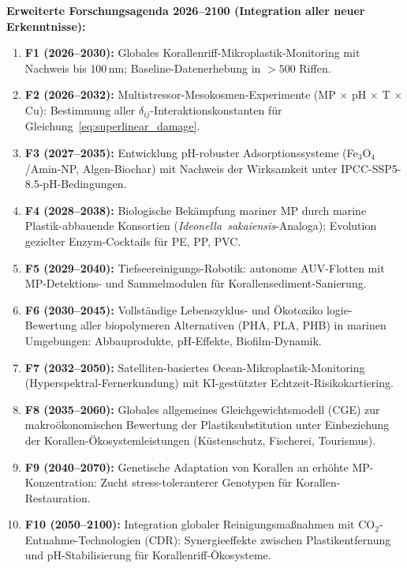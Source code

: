 ﻿\documentclass[12pt,a4paper]{article}
\theoremstyle{definition}
\theoremstyle{remark}
\newcommand{\MP}{Mikroplastik}
\begin{document}
\begin{mdframed}[backgroundcolor=boxblue, linecolor=deepblue, linewidth=1.5pt]
\textbf{Erweiterte Forschungsagenda 2026--2100 (Integration aller neuer Erkenntnisse):}
\begin{enumerate}[noitemsep, leftmargin=*, label=\textbf{F\arabic*.}]
  \item \textbf{F1 (2026--2030):} Globales Korallenriff-\MP{}-Monitoring
    mit Nachweis bis $100$\,nm; Baseline-Datenerhebung in $>500$ Riffen.
  \item \textbf{F2 (2026--2032):} Multistressor-Mesokosmen-Experimente
    (MP $\times$ pH $\times$ T $\times$ Cu): Bestimmung aller $\delta_{ij}$-Interaktionskonstanten
    für Gleichung~\eqref{eq:superlinear_damage}.
  \item \textbf{F3 (2027--2035):} Entwicklung pH-robuster Adsorptionssysteme
    (Fe$_3$O$_4$/Amin-NP, Algen-Biochar) mit Nachweis der Wirksamkeit
    unter IPCC-SSP5-8.5-pH-Bedingungen.
  \item \textbf{F4 (2028--2038):} Biologische Bekämpfung mariner MP durch
    marine Plastik-abbauende Konsortien (\textit{Ideonella~sakaiensis}-Analoga);
    Evolution gezielter Enzym-Cocktails für PE, PP, PVC.
  \item \textbf{F5 (2029--2040):} Tiefseereinigungs-Robotik: autonome AUV-Flotten
    mit MP-Detektions- und Sammelmodulen für Korallensediment-Sanierung.
  \item \textbf{F6 (2030--2045):} Vollständige Lebenszyklus- und Ökotoxiko\-
    logie-Bewertung aller biopolymeren Alternativen (PHA, PLA, PHB) in
    marinen Umgebungen: Abbauprodukte, pH-Effekte, Biofilm-Dynamik.
  \item \textbf{F7 (2032--2050):} Satelliten-basiertes Ocean-\MP{}-Monitoring
    (Hyper\-spektral-Fernerkundung) mit KI-gestützter Echtzeit-Risikokartiering.
  \item \textbf{F8 (2035--2060):} Globales allgemeines Gleichgewichtsmodell (CGE)
    zur makroökonomischen Bewertung der Plastiksubstitution unter Einbeziehung
    der Korallen-Ökosystemleistungen (Küstenschutz, Fischerei, Tourismus).
  \item \textbf{F9 (2040--2070):} Genetische Adaptation von Korallen an erhöhte
    MP-Konzen\-tration: Zucht stress-toleranterer Genotypen für Korallen-Restauration.
  \item \textbf{F10 (2050--2100):} Integration globaler Reinigungsmaßnahmen mit
    CO$_2$-Ent\-nahme-Technologien (CDR): Synergieeffekte zwischen Plastikentfernung
    und pH-Stabilisierung für Korallenriff-Ökosysteme.
\end{enumerate}
\end{mdframed}
\end{document}
